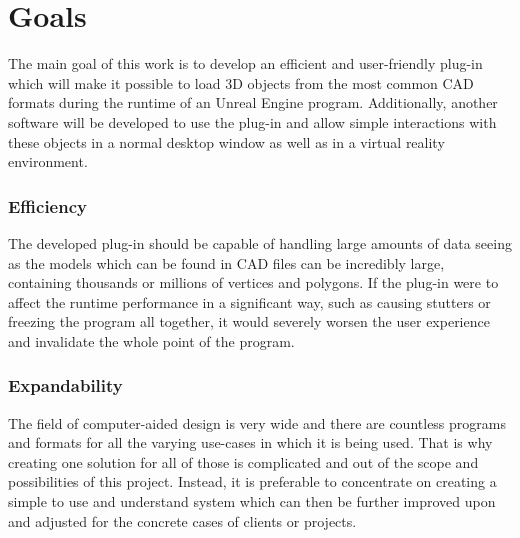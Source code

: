 \section{Goals}\label{chp:Goals}   
The main goal of this work is to develop an efficient and user-friendly plug-in which will make it possible to load 3D objects from the most common \acs{CAD} formats during the runtime of an Unreal Engine program. Additionally, another software will be developed to use the plug-in and allow simple interactions with these objects in a normal desktop window as well as in a virtual reality environment.

\subsubsection{Efficiency} 
The developed plug-in should be capable of handling large amounts of data seeing as the models which can be found in \acs{CAD} files can be incredibly large, containing thousands or millions of vertices and polygons. If the plug-in were to affect the runtime performance in a significant way, such as causing stutters or freezing the program all together, it would severely worsen the user experience and invalidate the whole point of the program.

\subsubsection{Expandability} 
The field of computer-aided design is very wide and there are countless programs and formats for all the varying use-cases in which it is being used. That is why creating one solution for all of those is complicated and out of the scope and possibilities of this project. Instead, it is preferable to concentrate on creating a simple to use and understand system which can then be further improved upon and adjusted for the concrete cases of clients or projects.

